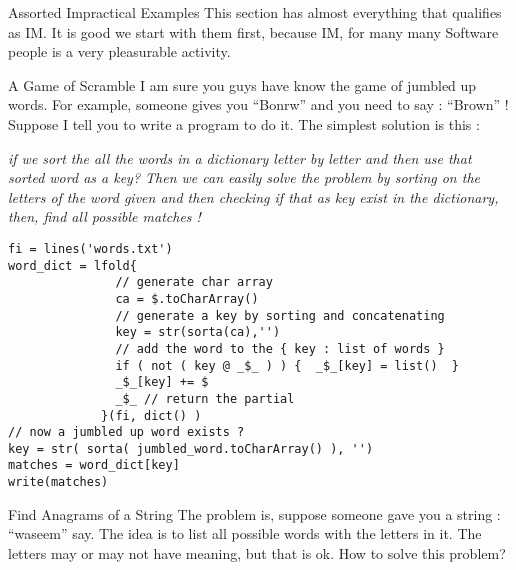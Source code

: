 \begin{section}{Assorted Impractical Examples}
This section has almost everything that qualifies as IM. It is good we start with them first,
because IM, for many many Software people is a very pleasurable activity.

\begin{subsection}{A Game of Scramble}
I am sure you guys have know the game of jumbled up words. For example, someone gives you ``Bonrw'' and you need to say : ``Brown'' ! 
Suppose I tell you to write a program to do it.
The simplest solution is this :

\begin{center}
\emph{if we sort the all the words in a dictionary letter by letter and then use that sorted word as a key? Then we can easily solve the problem by sorting on the letters of the word given and then checking if that as key exist in the dictionary, then, find all possible matches !}
\end{center}
\begin{center}\begin{minipage}{\linewidth}
\begin{lstlisting}[style=JexlStyle]
fi = lines('words.txt')
word_dict = lfold{ 
               // generate char array
               ca = $.toCharArray()  
               // generate a key by sorting and concatenating 
               key = str(sorta(ca),'') 
               // add the word to the { key : list of words } 
               if ( not ( key @ _$_ ) ) {  _$_[key] = list()  }
               _$_[key] += $ 
               _$_ // return the partial 
             }(fi, dict() )
// now a jumbled up word exists ?
key = str( sorta( jumbled_word.toCharArray() ), '')
matches = word_dict[key]
write(matches)
\end{lstlisting}  
\end{minipage}\end{center}
\end{subsection}

\begin{subsection}{Find Anagrams of a String}
The problem is, suppose someone gave you a string : ``waseem'' say. The idea is to list all possible words
with the letters in it. The letters may or may not have meaning, but that is ok. How to solve this problem?


\end{subsection}
\end{section}
